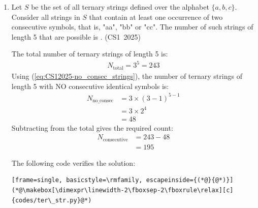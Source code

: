 \begin{enumerate}[label=\thesubsection.\arabic*, ref=\thesubsection.\theenumi]
For the 16-bit representation, $+6$ is expressed as $0000\,0000\,0000\,0110_2$. Flipping all the bits gives the 1's complement $1111\,1111\,1111\,1001_2$. Adding $1$ yields the 2's complement:
\begin{align}
1111\,1111\,1111\,1001_2 + 1 = 1111\,1111\,1111\,1010_2
\end{align}

Therefore, options (b) and (d) are correct.

\vspace{0.2cm}
The following code verifies the solution:
\begin{lstlisting}[frame=single, basicstyle=\rmfamily, escapeinside={(*@}{@*)}]
(*@\makebox[\dimexpr\linewidth-2\fboxsep-2\fboxrule\relax][c]{codes/2comple.c}@*)
\end{lstlisting}

\vspace{0.5cm}
\item Let $S$ be the set of all ternary strings defined over the alphabet $\{a, b, c\}$. Consider all strings in $S$ that contain at least one occurrence of two consecutive symbols, that is, "aa", "bb" or "cc". The number of such strings of length 5 that are possible is \underline{\hspace{1cm}}.
\hfill (CS1~2025)

\vspace{0.2cm}
\solution
The total number of ternary strings of length 5 is:
\begin{align}
N_{\text{total}} = 3^5 = 243
\end{align}
Using (\ref{eq:CS12025-no_consec_strings}), the number of ternary strings of length 5 with NO consecutive identical symbols is:
\begin{align}
N_{\text{no\_consec}} &= 3 \times (3-1)^{5-1} \\
                      &= 3 \times 2^4 \\
                      &= 48
\end{align}
Subtracting from the total gives the required count:
\begin{align}
N_{\text{consecutive}} &= 243 - 48 \\
                       &= 195
\end{align}

\vspace{0.2cm}
The following code verifies the solution:
\begin{lstlisting}[frame=single, basicstyle=\rmfamily, escapeinside={(*@}{@*)}]
(*@\makebox[\dimexpr\linewidth-2\fboxsep-2\fboxrule\relax][c]{codes/ter\_str.py}@*)
\end{lstlisting}


\end{enumerate}
